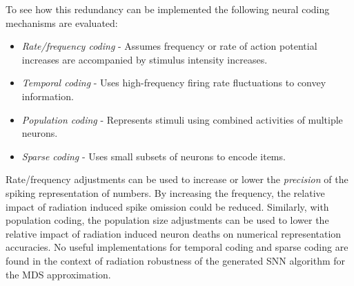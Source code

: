 To see how this redundancy can be implemented the following neural coding mechanisms are evaluated:
\begin{itemize}
    \item \textit{Rate/frequency coding} - Assumes frequency or rate of action potential increases are accompanied by stimulus intensity increases.
    \item \textit{Temporal coding} - Uses high-frequency firing rate fluctuations to convey information. %
    \item \textit{Population coding} - Represents stimuli using combined activities of multiple neurons.%
    \item \textit{Sparse coding} - Uses small subsets of neurons to encode items. %
\end{itemize}
Rate/frequency adjustments can be used to increase or lower the \textit{precision} %
of the spiking representation of numbers. By increasing the frequency, the relative impact of radiation induced spike omission could be reduced. %
Similarly, with population coding, the population size adjustments can be used to lower the relative impact of radiation induced neuron deaths on numerical representation accuracies. No useful implementations for temporal coding and sparse coding are found in the context of radiation robustness of the generated SNN algorithm for the MDS approximation.